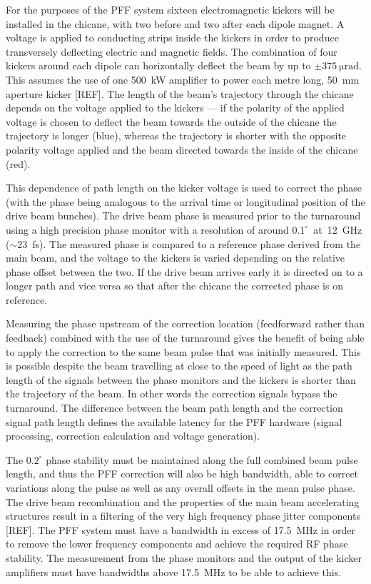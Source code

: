 For the purposes of the PFF system sixteen electromagnetic kickers will be installed in the chicane, with two before and two after each dipole magnet. A voltage is applied to conducting strips inside the kickers in order to produce transversely deflecting electric and magnetic fields. The combination of four kickers around each dipole can horizontally deflect the beam by up to \(\pm375~\mathrm{\mu rad}\). This assumes the use of one 500~kW amplifier to power each metre long, 50~mm aperture kicker [REF]. The length of the beam's trajectory through the chicane depends on the voltage applied to the kickers --- if the polarity of the applied voltage is chosen to deflect the beam towards the outside of the chicane the trajectory is longer (blue), whereas the trajectory is shorter with the opposite polarity voltage applied and the beam directed towards the inside of the chicane (red).

This dependence of path length on the kicker voltage is used to correct the phase (with the phase being analogous to the arrival time or longitudinal position of the drive beam bunches). The drive beam phase is measured prior to the turnaround using a high precision phase monitor with a resolution of around \(0.1^\circ\)~at~12~GHz (\(\sim23\)~fs). The measured phase is compared to a reference phase derived from the main beam, and the voltage to the kickers is varied depending on the relative phase offset between the two. If the drive beam arrives early it is directed on to a longer path and vice versa so that after the chicane the corrected phase is on reference.

Measuring the phase upstream of the correction location (feedforward rather than feedback) combined with the use of the turnaround gives the benefit of being able to apply the correction to the same beam pulse that was initially measured. This is possible  despite the beam travelling at close to the speed of light as the path length of the signals between the phase monitors and the kickers is shorter than the trajectory of the beam. In other words the correction signals bypass the turnaround. The difference between the beam path length and the correction signal path length defines the available latency for the PFF hardware (signal processing, correction calculation and voltage generation).

The \(0.2^\circ\) phase stability must be maintained along the full combined beam pulse length, and thus the PFF correction will also be high bandwidth, able to correct variations along the pulse as well as any overall offsets in the mean pulse phase. The drive beam recombination and the properties of the main beam accelerating structures result in a filtering of the very high frequency phase jitter components [REF]. The PFF system must have a bandwidth in excess of 17.5~MHz in order to remove the lower frequency components and achieve the required RF phase stability. The measurement from the phase monitors and the output of the kicker amplifiers must have bandwidths above 17.5~MHz to be able to achieve this.

